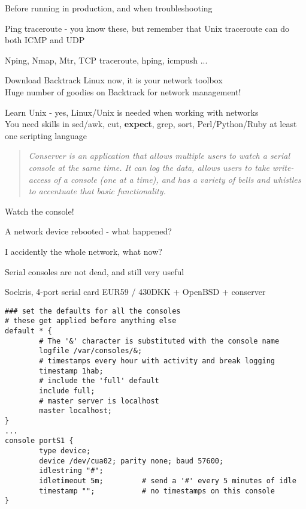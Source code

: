 \documentclass[28pt,landscape,a4paper,footrule]{foils}
\begin{document}

\begin{slidelist}
\item Before running in production, and when troubleshooting
\item Ping traceroute - you know these, but remember that Unix traceroute can do both ICMP and UDP
\item Nping, Nmap, Mtr, TCP traceroute, hping, icmpush ...
\item Download Backtrack Linux now, it is your network toolbox\\
Huge number of goodies on Backtrack for network management!\\
\item Learn Unix - yes, Linux/Unix is needed when working with networks\\
You need skills in sed/awk, cut, {\bf expect}, grep, sort, Perl/Python/Ruby at least one scripting language  
\end{slidelist}


\begin{quote}
\it Conserver is an application that allows multiple users to watch a serial console at the same time. It can log the data, allows users to take write-access of a console (one at a time), and has a variety of bells and whistles to accentuate that basic functionality. 
\end{quote}

\begin{slidelist}
\item Watch the console!
\item A network device rebooted - what happened?
\item I accidently the whole network, what now?
\item Serial consoles are not dead, and still very useful
\item {}
\end{slidelist}



\centerline{Soekris, 4-port serial card EUR59 / 430DKK + OpenBSD + conserver}

\footnotesize
\begin{verbatim}
### set the defaults for all the consoles
# these get applied before anything else
default * {
        # The '&' character is substituted with the console name
        logfile /var/consoles/&;
        # timestamps every hour with activity and break logging
        timestamp 1hab;
        # include the 'full' default
        include full;
        # master server is localhost
        master localhost;
}
...
console portS1 {
        type device;
        device /dev/cua02; parity none; baud 57600;
        idlestring "#";
        idletimeout 5m;         # send a '#' every 5 minutes of idle
        timestamp "";           # no timestamps on this console
}
\end{verbatim}
\normalsize
\end{document}
